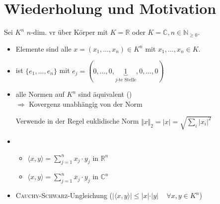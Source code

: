 \section{Wiederholung und Motivation}
Sei $K^n$ $n$-dim. \gls{vr} über Körper mit $K=\mathbb{R}$ oder $K=\mathbb{C}, n\in\mathbb{N}_{\ge 0}$.
\begin{itemize}
	\item Elemente sind alle $x=(x_1, \dotsc, x_n)\in K^n$ mit $x_1, \dotsc, x_n\in K$.
	\item {} ist $\{e_1, \dotsc, e_n\}$ mit $e_j=(0,\dotsc,0,\underbrace{1}_{\text{$j$-te Stelle}},0,\dotsc,0)$
	\item alle Normen auf $K^n$ sind äquivalent () \\
	$\Rightarrow$ Kovergenz unabhängig von der Norm
	
	Verwende in der Regel euklidische Norm $\Vert x \Vert_2 = \vert x \vert = \sqrt{\sum\limits_{i}\vert x_i \vert^2}$
	\item {}
	\begin{itemize}
		\item $\langle x,y \rangle = \sum\limits_{j=1}^{n} x_j\cdot y_j$ in $\mathbb{R}^n$
		\item $\langle x,y \rangle = \sum\limits_{j=1}^{n} \overline{x}_j\cdot y_j$ in $\mathbb{C}^n$
	\end{itemize}
	\item \textsc{Cauchy}-\textsc{Schwarz}-Ungleichung ($\vert \langle x,y\rangle \vert \le \vert x \vert \cdot \vert y \vert\,\quad\forall x,y\in K^n$)
\end{itemize}

